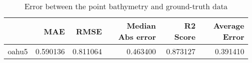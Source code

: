 \begin{table}[h!]
\caption{Error between the point bathymetry and ground-truth data}
\label{tab:oahu5_lidar_error}
\begin{tabular}{lrrrrr}
\toprule
 & MAE & RMSE & Median Abs error & R2 Score & Average Error \\
\midrule
oahu5 & 0.590136 & 0.811064 & 0.463400 & 0.873127 & 0.391410 \\
\bottomrule
\end{tabular}
\end{table}
